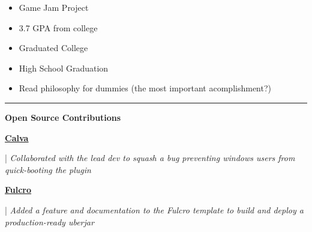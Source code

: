 \documentclass[letterpaper,11pt]{article}
\newcommand{\resumeItem}[1]{
  \item\small{
    {#1 \vspace{-2pt}}
  }
}
\newcommand{\resumeItemListStart}{\begin{itemize}}
\newcommand{\resumeItemListEnd}{\end{itemize}\vspace{-5pt}}
\begin{document}
\resumeItemListStart
\resumeItem{ Game Jam Project }
\resumeItemListEnd

\resumeItemListStart
\resumeItem{ 3.7 GPA from college }
\resumeItemListEnd


\resumeItemListStart
\resumeItem{ Graduated College }
\resumeItemListEnd

\resumeItemListStart
\resumeItem{ High School Graduation }
\resumeItemListEnd

\resumeItemListStart
\resumeItem{ Read philosophy for dummies (the most important acomplishment?) }
\resumeItemListEnd

\noindent\rule{19.5cm}{0.4pt}

\textbf{\large \textcolor{magic_blue}{Open Source Contributions}}

\begin{minipage}[t]{0.08\textwidth}
	\raggedright
	\href{https://github.com/BetterThanTomorrow/calva/issues/2325}{ \underline{\textbf{Calva}}} \\
\end{minipage}
\hfill
\begin{minipage}[t]{0.90\textwidth}
	\raggedright
	|\textit{ Collaborated with the lead dev to squash a bug preventing windows users from quick-booting the plugin } \\
\end{minipage}

\begin{minipage}[t]{0.08\textwidth}
	\raggedright
	\href{https://github.com/fulcrologic/fulcro-template/pull/28}{ \underline{\textbf{Fulcro}}} \\
\end{minipage}
\hfill
\begin{minipage}[t]{0.90\textwidth}
	\raggedright
	|\textit{ Added a feature and documentation to the Fulcro template to build and deploy a production-ready uberjar } \\
\end{minipage}
\end{document}
